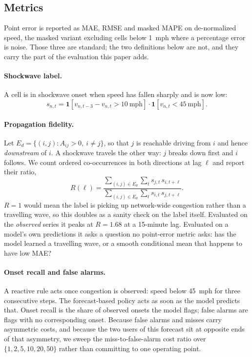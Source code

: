 \documentclass[letterpaper]{article}
\begin{document}
\subsection{Metrics}
\label{sec:metrics}

Point error is reported as MAE, RMSE and masked MAPE on de-normalized speed, the masked variant excluding cells below 1~mph where a percentage error is noise. Those three are standard; the two definitions below are not, and they carry the part of the evaluation this paper adds.

\paragraph{Shockwave label.} A cell is in shockwave onset when speed has fallen sharply and is now low:
\begin{equation}
s_{n,t}=\mathbf{1}\!\left[v_{n,t-3}-v_{n,t}>10\ \text{mph}\right]\cdot
        \mathbf{1}\!\left[v_{n,t}<45\ \text{mph}\right].
\end{equation}

\paragraph{Propagation fidelity.}
\label{sec:propagation}
Let $E_d=\{(i,j):A_{ij}>0,\ i\neq j\}$, so that $j$ is reachable driving from $i$ and hence \emph{downstream} of $i$. A shockwave travels the other way: $j$ breaks down first and $i$ follows. We count ordered co-occurrences in both directions at lag $\ell$ and report their ratio,
\begin{equation}
R(\ell)=\frac{\sum_{(i,j)\in E_d}\sum_t s_{j,t}\,s_{i,t+\ell}}
             {\sum_{(i,j)\in E_d}\sum_t s_{i,t}\,s_{j,t+\ell}} .
\end{equation}
$R=1$ would mean the label is picking up network-wide congestion rather than a travelling wave, so this doubles as a sanity check on the label itself. Evaluated on the \emph{observed} series it peaks at $R=1.68$ at a 15-minute lag. Evaluated on a model's own predictions it asks a question no point-error metric asks: has the model learned a travelling wave, or a smooth conditional mean that happens to have low MAE?

\paragraph{Onset recall and false alarms.} A reactive rule acts once congestion is observed: speed below 45~mph for three consecutive steps. The forecast-based policy acts as soon as the model predicts that. Onset recall is the share of observed onsets the model flags; false alarms are flags with no corresponding onset. Because false alarms and misses carry asymmetric costs, and because the two users of this forecast sit at opposite ends of that asymmetry, we sweep the miss-to-false-alarm cost ratio over $\{1,2,5,10,20,50\}$ rather than committing to one operating point.
\end{document}
